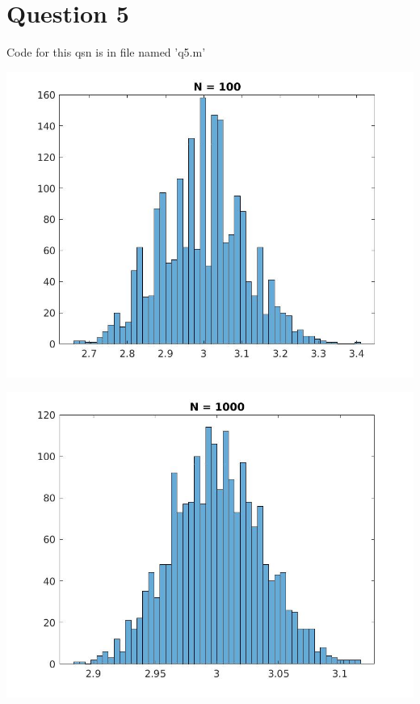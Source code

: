 \documentclass{article}
\theoremstyle{remark}
\begin{document}
\section{Question 5}
Code for this qsn is in file named 'q5.m' \par
\includegraphics[width=\textwidth, height=\textheight, keepaspectratio]{p1_100.jpg}\par
\includegraphics[width=\textwidth, height=\textheight, keepaspectratio]{p1_1000.jpg}\par
\end{document}
